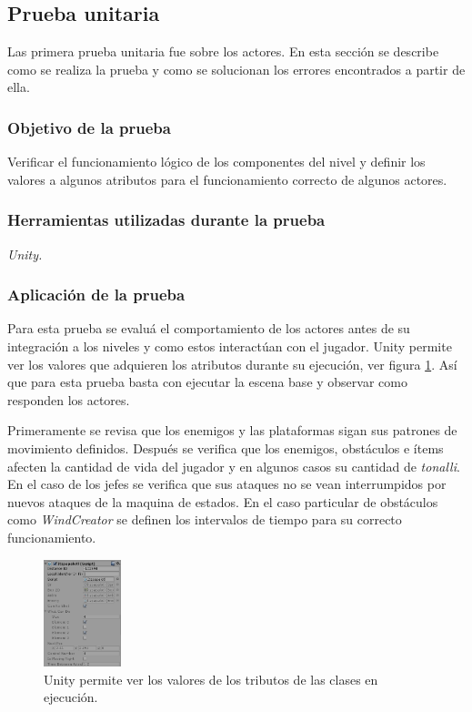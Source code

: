 \subsection{Prueba unitaria}
Las primera prueba unitaria fue sobre los actores. En esta sección se describe 
como se realiza la prueba y como se solucionan los errores encontrados a partir 
de ella. 
\subsubsection{Objetivo de la prueba}
Verificar el funcionamiento lógico de los componentes del nivel y definir los 
valores a algunos atributos para el funcionamiento correcto de algunos actores. 
\subsubsection{Herramientas utilizadas durante la prueba}
\textit{Unity.}
\subsubsection{Aplicación de la prueba}
Para esta prueba se evaluá el comportamiento de los actores antes de su 
integración a los niveles y como estos interactúan con el jugador. Unity permite 
ver los valores que adquieren los atributos durante su ejecución, ver figura 
\ref{fig:Debug01}. Así que para esta prueba basta con ejecutar la escena 
base y observar como responden los actores.
\\
\par
Primeramente se revisa que los enemigos y las plataformas sigan sus patrones de 
movimiento definidos. Después se verifica que los enemigos, obstáculos e ítems 
afecten la cantidad de vida del jugador y en algunos casos su cantidad de 
\textit{tonalli}. En el caso de los jefes se verifica que sus ataques no se vean 
interrumpidos por nuevos ataques de la maquina de estados. En el caso particular 
de obstáculos como \textit{WindCreator} se definen los intervalos de tiempo 
para su correcto funcionamiento. 

		\begin{figure}[h]
    			\centering
    			\includegraphics[width=0.2\textwidth]{04ResultadosObetnidos/imagenes/enemyPruebas01.png}
    			\caption{Unity permite ver los valores de los tributos de las clases en ejecución.}
    			\label{fig:Debug01}
		\end{figure}
		
